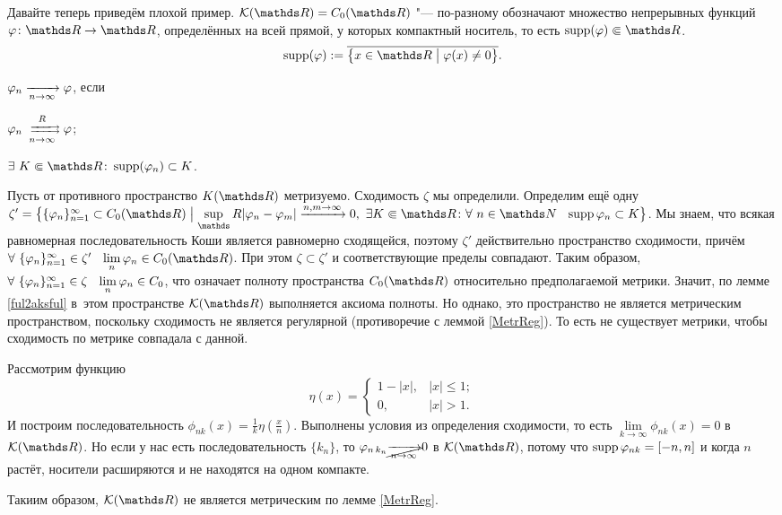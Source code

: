 Давайте теперь приведём плохой пример. $\mathcal K(\R) = C_0(\R)$ "--- по-разному обозначают множество непрерывных функций $\phi\colon \R\to\R$, определённых на всей прямой, у которых компактный носитель, то есть $\supp(\phi) \spp \R$.
\[
  \supp(\phi):=\overline{\big\{x\in\R\bigm|\phi(x)\ne0\big\}}.
\]
\begin{Def}
  $\varphi_n\xrightarrow[n\rightarrow\infty]{}\varphi$, если
\begin{roItems}
\item $\phi_n \rsh[R]n\phi$;
\item $\exists\ K\spp\R\colon \supp(\phi_n)\subset K$.
\end{roItems}
\end{Def}

Пусть от противного пространство $K(\R)$ метризуемо. Сходимость $\zeta$ мы определили. Определим ещё одну $\zeta' = \big\{\{\phi_n\}_{n=1}^\infty\subset C_0(\R)\bigm| \sup\limits_\R|\phi_n-\phi_m|\xrightarrow{n,m\to\infty}0,\ \exists K\Subset \R\colon \forall\ n\in\N\pau \supp \phi_n\subset K\big\}$.
Мы знаем, что всякая равномерная последовательность Коши является равномерно сходящейся, поэтому $\zeta'$ действительно пространство сходимости, причём $\forall\ \{\phi_n\}_{n=1}^\infty\in\zeta'\pau \lim\limits_n\phi_n \in C_0(\R)$. При этом $\zeta\subset \zeta'$ и соответствующие пределы совпадают.  Таким образом, $\forall\ \{\phi_n\}_{n=1}^\infty\in\zeta\pau \lim\limits_n\phi_n\in C_0$, что означает полноту пространства $C_0(\R)$ относительно предполагаемой метрики. Значит, по лемме \ref{ful2aksful} в~этом пространстве $\mathcal K(\R)$ выполняется аксиома полноты. Но однако, это пространство не является метрическим пространством, поскольку сходимость не является регулярной (противоречие с леммой \ref{MetrReg}). То есть не существует метрики, чтобы сходимость по метрике совпадала с данной.

\begin{Proof}
Рассмотрим функцию
\[
\eta(x) = \begin{cases}
  1-|x|,&|x|\le1;\\
 0,&|x|>1.
\end{cases}
\]
И построим последовательность $\phi_{nk}(x) = \frac1k\eta\left(\frac xn\right)$. Выполнены условия из определения сходимости, то есть $\lim\limits_{k\to\infty}\phi_{nk}(x) = 0$ в $\mathcal K(\R)$. Но если у нас есть последовательность $\{k_n\}$, то $\varphi_{n\,k_n}\cancel{\xrightarrow[n\rightarrow\infty]{}}0$ в $\mathcal K(\R)$, потому что $\operatorname{supp}\varphi_{nk} = [-n,n]$ и когда $n$ растёт, носители расширяются и не находятся на одном компакте. 

Такиим образом, $\mathcal K(\R)$ не является метрическим по лемме \ref{MetrReg}.
\end{Proof}

